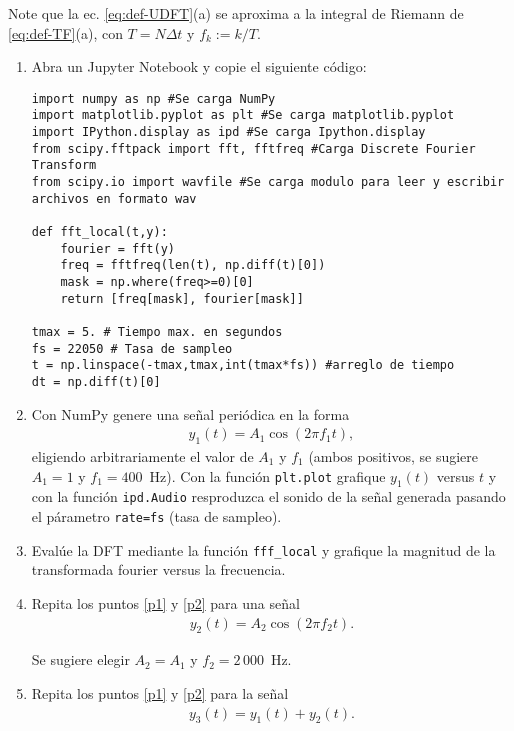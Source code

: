 \documentclass[11pt]{exam}
\begin{document}
Note que la ec. \eqref{eq:def-UDFT}(a) se aproxima a la integral de Riemann de \eqref{eq:def-TF}(a), con $T=N\Delta t$ y $f_k:= k/T$.

\begin{enumerate}
\item Abra un Jupyter Notebook y copie el siguiente c\'odigo:

\begin{verbatim}
import numpy as np #Se carga NumPy
import matplotlib.pyplot as plt #Se carga matplotlib.pyplot
import IPython.display as ipd #Se carga Ipython.display
from scipy.fftpack import fft, fftfreq #Carga Discrete Fourier Transform
from scipy.io import wavfile #Se carga modulo para leer y escribir archivos en formato wav

def fft_local(t,y):
    fourier = fft(y)
    freq = fftfreq(len(t), np.diff(t)[0])
    mask = np.where(freq>=0)[0]
    return [freq[mask], fourier[mask]]
    
tmax = 5. # Tiempo max. en segundos
fs = 22050 # Tasa de sampleo
t = np.linspace(-tmax,tmax,int(tmax*fs)) #arreglo de tiempo
dt = np.diff(t)[0]
\end{verbatim}

\item \label{p1} Con NumPy genere una se\~nal peri\'odica en la forma
\begin{align}
y_{1}(t) = A_{1}\cos(2\pi f_{1}t),
\end{align}
%
eligiendo arbitrariamente el valor de $A_{1}$ y $f_{1}$ (ambos positivos, se sugiere $A_{1}=1$ y $f_{1}=400$~Hz). Con la funci\'on \texttt{plt.plot} grafique $y_{1}(t)$ versus $t$ y con la funci\'on \texttt{ipd.Audio} resproduzca el sonido de la se\~nal generada pasando el p\'arametro \texttt{rate=fs} (tasa de sampleo).

\item \label{p2} Eval\'ue la DFT mediante la funci\'on \texttt{fff\_local} y grafique la magnitud de la transformada fourier versus la frecuencia.

\item Repita los puntos \ref{p1} y \ref{p2} para una se\~nal
\begin{align}
y_{2}(t) = A_{2}\cos(2\pi f_{2}t).
\end{align}

Se sugiere elegir $A_{2}=A_{1}$ y $f_{2}=2\,000$~Hz.

\item Repita los puntos \ref{p1} y \ref{p2} para la se\~nal
\begin{align}
y_{3}(t) = y_{1}(t)+y_{2}(t).
\end{align}


\end{enumerate}
\end{document}

